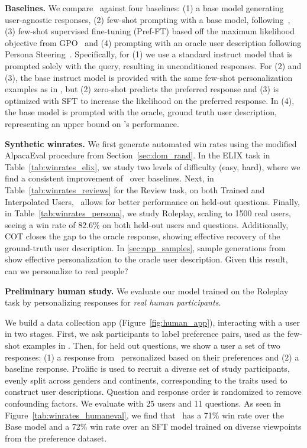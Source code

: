 \noindent \textbf{Baselines.} We compare \methodname\ against four baselines: (1) a base model generating user-agnostic responses, (2) few-shot prompting with a base model, following~\citet{meister2024benchmarkingdistributionalalignmentlarge}, (3) few-shot supervised fine-tuning (Pref-FT) based off the maximum likelihood objective from GPO~\citep{zhao2024grouppreferenceoptimizationfewshot} and (4) prompting with an oracle user description following Persona Steering~\citep{cheng-etal-2023-marked}. Specifically, for (1) we use a standard instruct model that is prompted solely with the query, resulting in unconditioned responses. For (2) and (3), the base instruct model is provided with the same few-shot personalization examples as in \methodname, but (2) zero-shot predicts the preferred response and (3) is optimized with SFT to increase the likelihood on the preferred response. In (4), the base model is prompted with the oracle, ground truth user description, representing an upper bound on \methodname’s performance.


\noindent \textbf{Synthetic winrates.} 
We first generate automated win rates using the modified AlpacaEval procedure from Section~\ref{sec:dom_rand}. In the ELIX task in Table~\ref{tab:winrates_elix}, we study two levels of difficulty (easy, hard), where we find a consistent improvement of \methodname\ over baselines. Next, in Table~\ref{tab:winrates_reviews} for the Review task, on both Trained and Interpolated Users, \methodname\ allows for better performance on held-out questions. Finally, in Table~\ref{tab:winrates_persona}, we study Roleplay, scaling to 1500 real users, seeing a win rate of 82.6\% on both held-out users and questions. Additionally, COT closes the gap to the oracle response, showing effective recovery of the ground-truth user description. In \cref{sec:app_samples}, sample generations from \methodname\, show effective personalization to the oracle user description. Given this result, can we personalize to real people?

\noindent \textbf{Preliminary human study.} We evaluate our model trained on the Roleplay task by personalizing responses for \emph{real human participants}. 

We build a data collection app (Figure~\ref{fig:human_app}), interacting with a user in two stages. First, we ask participants to label preference pairs, used as the few-shot examples in \methodname. Then, for held out questions, we show a user a set of two responses: (1) a response from \methodname\ personalized based on their preferences and (2) a baseline response. Prolific is used to recruit a diverse set of study participants, evenly split across genders and continents, corresponding to the traits used to construct user descriptions. Question and response order is randomized to remove confounding factors. We evaluate with 25 users and 11 questions. As seen in Figure~\ref{tab:winrates_humaneval}, we find that \methodname\ has a 71\% win rate over the Base model and a 72\% win rate over an SFT model trained on diverse viewpoints from the preference dataset. 

